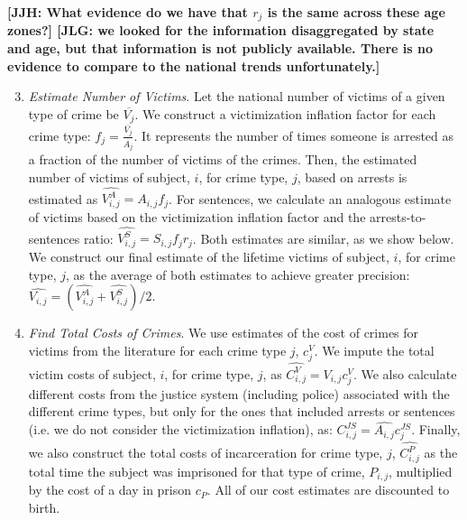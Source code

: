 \documentclass[static]{JJH-Beamer}
\begin{document}
\textbf{[JJH: What evidence do we have that $r_j$ is the same across these age zones?] [JLG: we looked for the information disaggregated by state and age, but that information is not publicly available. There is no evidence to compare to the national trends unfortunately.] }
\clearpage
\begin{frame}
 \addtocounter{framenumber}{-1}

\begin{enumerate}
\setcounter{enumi}{2}
\item \emph{Estimate Number of Victims}. Let the national number of victims of a given type of crime be $\overline{V_j}$. We construct a victimization inflation factor for each crime type: $f_j=\frac{\overline{V_j}}{\overline{A_j}}$. It represents the number of times someone is arrested as a fraction of the number of victims of the crimes. Then, the estimated number of victims of subject, $i$, for crime type, $j$, based on arrests is estimated as $\widehat{V_{i,j}^{A}}=A_{i,j}f_j$. For sentences, we calculate an analogous estimate of victims based on the victimization inflation factor and the arrests-to-sentences ratio: $\widehat{V_{i,j}^{S}}=S_{i,j}f_j r_j$. Both estimates are similar, as we show below. We construct our final estimate of the lifetime victims of subject, $i$, for crime type, $j$, as the average of both estimates to achieve greater precision: $\widehat{V_{i,j}}=\left(\widehat{V_{i,j}^A}+\widehat{V_{i,j}^S}\right)/2$.
\end{enumerate}

\end{frame}

\begin{frame}
 \addtocounter{framenumber}{-1}

\begin{enumerate}
\setcounter{enumi}{3}
\item \emph{Find Total Costs of Crimes}. We use estimates of the cost of crimes for victims from the literature for each crime type $j$, $c_j^V$. We impute the total victim costs of subject, $i$, for crime type, $j$, as $\widehat{C_{i,j}^V}=\widehat{V_{i,j}} c_j^V$. We also calculate different costs from the justice system (including police) associated with the different crime types, but only for the ones that included arrests or sentences (i.e. we do not consider the victimization inflation), as: $C_{i,j}^{JS}=\widehat{A_{i,j}} c_j^{JS}$. Finally, we also construct the total costs of incarceration for crime type, $j$, $\widehat{C_{i,j}^{P}}$ as the total time the subject was imprisoned for that type of crime, $P_{i,j}$, multiplied by the cost of a day in prison $c_P$. All of our cost estimates are discounted to birth.
\end{enumerate}

\end{frame}
\end{document}
